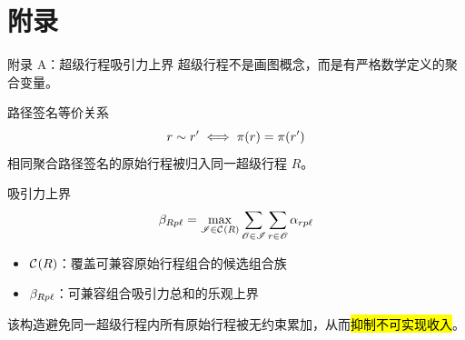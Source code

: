\appendix
\section{附录}


\begin{frame}{附录 A：超级行程吸引力上界}
\small 超级行程不是画图概念，而是有严格数学定义的聚合变量。

\vspace{0.1cm}
\begin{block}{路径签名等价关系}
\vspace{-0.2cm}
\[r \sim r' \;\Longleftrightarrow\; \pi({r})=\pi({r'})\]
\small 相同聚合路径签名的原始行程被归入同一超级行程 $R$。
\end{block}

\vspace{0.15cm}
\begin{block}{吸引力上界}
\vspace{-0.2cm}
\[\beta_{Rp\ell}=\max_{\mathscr{I}\in\mathcal{C}^{}(R)}\sum_{\mathscr{O}\in\mathscr{I}}\sum_{r\in\mathscr{O}}\alpha_{rp\ell}\]
\small
\begin{itemize}
    \item $\mathcal{C}^{}(R)$：覆盖可兼容原始行程组合的候选组合族
    \item $\beta_{Rp\ell}$：可兼容组合吸引力总和的乐观上界
\end{itemize}
\end{block}

\vspace{0.1cm}
\centering
\small 该构造避免同一超级行程内所有原始行程被无约束累加，从而\hl{抑制不可实现收入}。
\end{frame}



